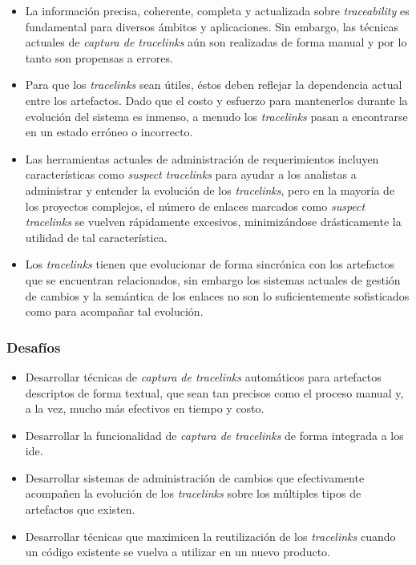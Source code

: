 \documentclass[a4paper,12pt,oneside,spanish]{book}
\begin{document}
\begin{itemize}[label={$\times$}]

\item La información precisa, coherente, completa y actualizada sobre \textit{traceability} es fundamental para diversos ámbitos y aplicaciones. Sin embargo, las técnicas actuales de \textit{captura de tracelinks} aún son realizadas de forma manual y por lo tanto son propensas a errores.

\item Para que los \textit{tracelinks} sean útiles, éstos deben reflejar la dependencia actual entre los artefactos. Dado que el costo y esfuerzo para mantenerlos durante la evolución del sistema es inmenso, a menudo los \textit{tracelinks} pasan a encontrarse en un estado erróneo o incorrecto.

\item Las herramientas actuales de administración de requerimientos incluyen características como \textit{suspect tracelinks} para ayudar a los analistas a administrar y entender la evolución de los \textit{tracelinks}, pero en la mayoría de los proyectos complejos, el número de enlaces marcados como \textit{suspect tracelinks} se vuelven rápidamente excesivos, minimizándose drásticamente la utilidad de tal característica.
 
\item Los \textit{tracelinks} tienen que evolucionar de forma sincrónica con los artefactos que se encuentran relacionados, sin embargo los sistemas actuales de gestión de cambios y la semántica de los enlaces no son lo suficientemente sofisticados como para acompañar tal evolución.

\end{itemize}

\subsubsection{Desafíos}

\begin{itemize}[label={\checkmark}]

\item Desarrollar técnicas de \textit{captura de tracelinks} automáticos para artefactos descriptos de forma textual, que sean tan precisos como el proceso manual y, a la vez, mucho más efectivos en tiempo y costo.

\item Desarrollar la funcionalidad de \textit{captura de tracelinks} de forma integrada a los \gls{ide}.

\item Desarrollar sistemas de administración de cambios que efectivamente acompañen la evolución de los \textit{tracelinks} sobre los múltiples tipos de artefactos que existen.

\item Desarrollar técnicas que maximicen la reutilización de los \textit{tracelinks} cuando un código existente se vuelva a utilizar en un nuevo producto.

\end{itemize}
\end{document}
